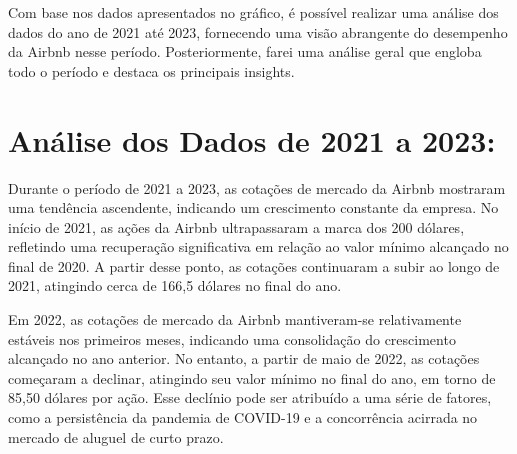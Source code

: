 \documentclass{article}
\begin{document}
\begin{figure}[ht]
    \centering
    \end{figure}

Com base nos dados apresentados no gráfico, é possível realizar uma análise dos dados do ano de 2021 até 2023, fornecendo uma visão abrangente do desempenho da Airbnb nesse período. Posteriormente, farei uma análise geral que engloba todo o período e destaca os principais insights.

    \section*{Análise dos Dados de 2021 a 2023:}

 Durante o período de 2021 a 2023, as cotações de mercado da Airbnb mostraram uma tendência ascendente, indicando um crescimento constante da empresa. No início de 2021, as ações da Airbnb ultrapassaram a marca dos 200 dólares, refletindo uma recuperação significativa em relação ao valor mínimo alcançado no final de 2020. A partir desse ponto, as cotações continuaram a subir ao longo de 2021, atingindo cerca de 166,5 dólares no final do ano.

 Em 2022, as cotações de mercado da Airbnb mantiveram-se relativamente estáveis nos primeiros meses, indicando uma consolidação do crescimento alcançado no ano anterior. No entanto, a partir de maio de 2022, as cotações começaram a declinar, atingindo seu valor mínimo no final do ano, em torno de 85,50 dólares por ação. Esse declínio pode ser atribuído a uma série de fatores, como a persistência da pandemia de COVID-19 e a concorrência acirrada no mercado de aluguel de curto prazo.
\end{document}
